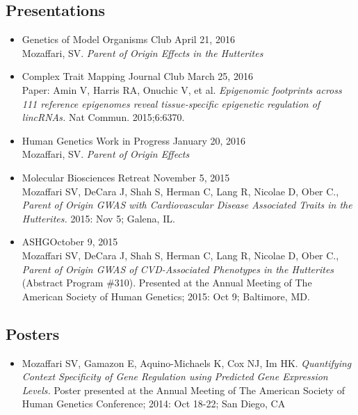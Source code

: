 \documentclass[a4paper, 11pt]{article}
\begin{document}
\subsection*{Presentations}
\begin{itemize}
	\item Genetics of Model Organisms Club \hfill April 21, 2016\\
	Mozaffari, SV. \emph{Parent of Origin Effects in the Hutterites}
    \item Complex Trait Mapping Journal Club \hfill March 25, 2016\\
    Paper: Amin V, Harris RA, Onuchic V, et al. \emph{Epigenomic footprints across 111 reference epigenomes reveal tissue-specific epigenetic regulation of lincRNAs.} Nat Commun. 2015;6:6370.
	\item Human Genetics Work in Progress \hfill January 20, 2016\\
    		Mozaffari, SV. \emph{Parent of Origin Effects} 
	\item Molecular Biosciences Retreat \hfill November 5, 2015\\ Mozaffari SV, DeCara J, Shah S, Herman C, Lang R, Nicolae D, Ober C., \emph{Parent of Origin GWAS with Cardiovascular Disease Associated Traits in the Hutterites.} 2015: Nov 5; Galena, IL.
    \item ASHG\hfill October 9, 2015\\ Mozaffari SV, DeCara J, Shah S, Herman C, Lang R, Nicolae D, Ober C., \emph{Parent of Origin GWAS of CVD-Associated Phenotypes in the Hutterites} (Abstract Program \#310). Presented at the Annual Meeting of The American Society of Human Genetics; 2015: Oct 9; Baltimore, MD. 
  

\end{itemize}

\subsection*{Posters}
\begin{itemize}
    \item Mozaffari SV, Gamazon E, Aquino-Michaels K, Cox NJ, Im HK. \emph{Quantifying Context Specificity of Gene Regulation using Predicted Gene Expression Levels.} Poster presented at the Annual Meeting of The American Society of Human Genetics Conference; 2014: Oct 18-22; San Diego, CA 
\end{itemize}
\end{document}
